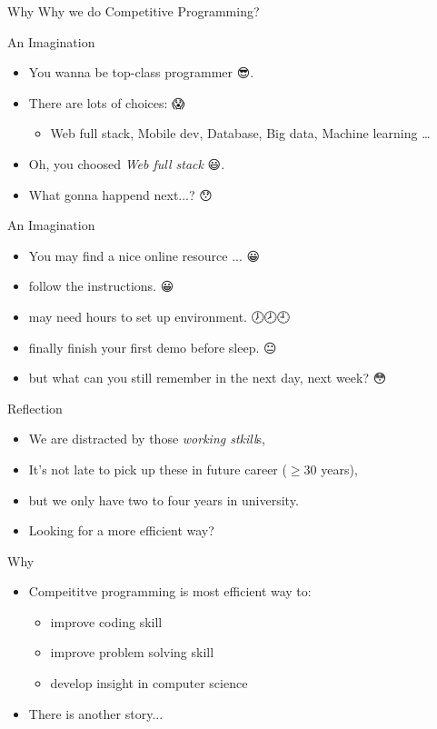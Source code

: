 \begin{frame}{Why}
  \centering
  \huge{Why we do Competitive Programming?}
\end{frame}

\begin{frame}{An Imagination}
\begin{itemize}
  \item<1-> You wanna be top-class programmer 😎.
  \item<2-> There are lots of choices: 😱
    \begin{itemize}
      \item<3-> Web full stack, Mobile dev,
      Database, Big data, Machine learning \ldots
    \end{itemize}
  \item<4-> Oh, you choosed \textit{Web full stack} 😃.
  \item<5-> What gonna happend next...? 😯
\end{itemize}
\end{frame}

\begin{frame}{An Imagination}
\begin{itemize}
  \item<2-> You may find a nice online resource ... 😀
  \item<3-> follow the instructions. 😀
  \item<4-> may need hours to set up environment. 🕖🕗🕘
  \item<5-> finally finish your first demo before sleep. 😐
  \item<6-> but what can you still remember in the next day, next week? 😳
\end{itemize}
\end{frame}

\begin{frame}{Reflection}
\begin{itemize}
  \item<2-> We are distracted by those \textit{working stkill}s,
  \item<3-> It's not late to pick up these in future career ($\ge 30$ years),
  \item<4-> but we only have two to four years in university.
  \item<5-> Looking for a more efficient way?
\end{itemize}
\end{frame}

\begin{frame}{Why}
\begin{itemize}
  \item<1-> Compeititve programming is most efficient way to:
  \begin{itemize}
    \item<2-> improve coding skill
    \item<3-> improve problem solving skill
    \item<4-> develop insight in computer science
  \end{itemize}
  \item<5-> There is another story...
\end{itemize}
\end{frame}

